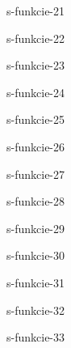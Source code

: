 	\begin{defproblem}{s-funkcie-21}
	
	\end{defproblem}
	
	\begin{defproblem}{s-funkcie-22}
	
	\end{defproblem}
	
	\begin{defproblem}{s-funkcie-23}
	
	\end{defproblem}
	
	\begin{defproblem}{s-funkcie-24}
	
	\end{defproblem}
	
	\begin{defproblem}{s-funkcie-25}
	
	\end{defproblem}
	
	\begin{defproblem}{s-funkcie-26}
	
	\end{defproblem}
	
	\begin{defproblem}{s-funkcie-27}
	
	\end{defproblem}
	
	\begin{defproblem}{s-funkcie-28}
	
	\end{defproblem}
	
	\begin{defproblem}{s-funkcie-29}
	
	\end{defproblem}
	
	\begin{defproblem}{s-funkcie-30}
	
	\end{defproblem}
	
	\begin{defproblem}{s-funkcie-31}
	
	\end{defproblem}
	
	\begin{defproblem}{s-funkcie-32}
	
	\end{defproblem}
	
	\begin{defproblem}{s-funkcie-33}
	
	\end{defproblem}